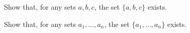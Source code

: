 \documentclass[../../../include/open-logic-section]{subfiles}
\begin{document}
\begin{prob}
Show that, for any sets $a, b, c$, the set $\{a, b, c\}$ exists.
\end{prob}

\begin{prob}
Show that, for any sets $a_1, \ldots, a_n$, the set $\{a_1, \ldots,
a_n\}$ exists.
\end{prob}

\end{document}
